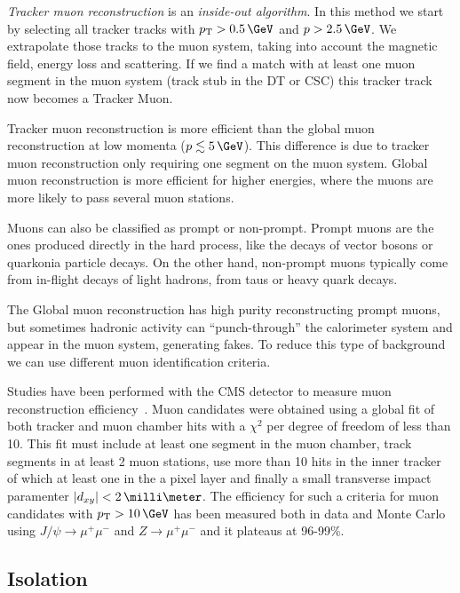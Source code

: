 \textit{Tracker muon reconstruction} is an \textit{inside-out algorithm}. In this method we start by selecting all tracker tracks with $\pt>0.5\,\GeV$ and $p>2.5\,\GeV$. We extrapolate those tracks to the muon system, taking into account the magnetic field, energy loss and scattering. If we find a match with at least one muon segment in the muon system (track stub in the \gls{DT} or \gls{CSC}) this tracker track now becomes a Tracker Muon. 

Tracker muon reconstruction is more efficient than the global muon reconstruction at low momenta ($p\lesssim 5\,\GeV$). This difference is due to tracker muon reconstruction only requiring one segment on the muon system. Global muon reconstruction is more efficient for higher energies, where the muons are more likely to pass several muon stations.

Muons can also be classified as prompt or non-prompt. Prompt muons are the ones produced directly in the hard process, like the decays of vector bosons or quarkonia particle decays. On the other hand, non-prompt muons typically come from in-flight decays of light hadrons, from taus or heavy quark decays. 

The Global muon reconstruction has high purity reconstructing prompt muons, but sometimes hadronic activity can ``punch-through'' the calorimeter system and appear in the muon system, generating fakes. To reduce this type of background we can use different muon identification criteria.

Studies have been performed with the \gls{CMS} detector to measure muon reconstruction efficiency~\cite{ARTICLE:CMSMuonReconstruction7TeV}. Muon candidates were obtained using a global fit of both tracker and muon chamber hits with a $\chi^2$ per degree of freedom of less than 10. This fit must include at least one segment in the muon chamber, track segments in at least 2 muon stations, use more than 10 hits in the inner tracker of which at least one in the a pixel layer and finally a small transverse impact paramenter $|d_{xy}|< 2\,\milli\meter$. The efficiency for such a criteria for muon candidates with $\pt>10\,\GeV$ has been measured both in data and Monte Carlo using $J/\psi \rightarrow \mu^+ \mu^-$ and $Z \rightarrow \mu^+ \mu^-$ and it plateaus at 96-99\%.

\subsection{Isolation}
\label{SUBSECTION:EventReconstructionAndSimulation_LeptonIsolation_MuonsIsolation}

